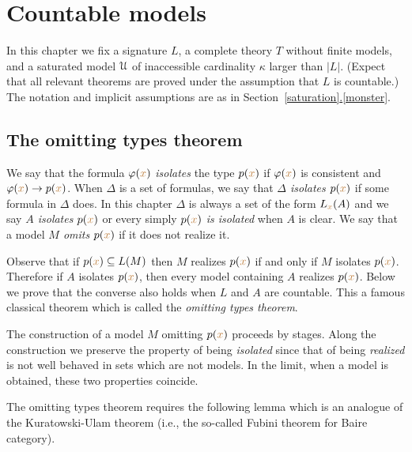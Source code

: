 \documentclass[creche.tex]{subfiles}
\begin{document}
\chapter{Countable models}
\label{countable}

\def\ceq#1#2#3{\parbox[b]{30ex}{$\displaystyle #1$}\parbox[b]{6ex}{\hfil$#2$}$\displaystyle #3$}

In this chapter we fix a signature $L$, a complete theory $T$ without finite models, and a saturated model $\EuScript U$ of inaccessible cardinality $\kappa$ larger than $|L|$.
(Expect that all relevant theorems are proved under the assumption that $L$ is countable.)
The notation and implicit assumptions are as in Section~\hyperref[monster]{\ref*{saturation}.\ref*{monster}}.



\section{The omitting types theorem}\label{omttingtype}

We say that the formula $\varphi({\color{brown} x})$ \emph{isolates\/} the type $p({\color{brown} x})$ if $\varphi({\color{brown} x})$ is consistent and $\varphi({\color{brown} x})\rightarrow p({\color{brown} x})$.
When $\Delta$ is a set of formulas, we say that \emph{$\Delta$ isolates $p({\color{brown} x})$\/} if some formula in $\Delta$ does.
In this chapter $\Delta$ is always a set of the form $L_{{\color{brown} x}}(A)$ and we say  \emph{$A$ isolates $p({\color{brown} x})$\/} or every simply \emph{$p({\color{brown} x})$ is isolated\/} when $A$ is clear.
We say that a model \emph{$M$ omits $p({\color{brown} x})$\/} if it does not realize it.


Observe that if $p({\color{brown} x})\subseteq L(M)$ then $M$ realizes $p({\color{brown} x})$ if and only if $M$ isolates  $p({\color{brown} x})$.
Therefore if $A$ isolates $p({\color{brown} x})$, then every model containing $A$ realizes $p({\color{brown} x})$.
Below we prove that the converse also holds when $L$ and $A$ are countable.
This a famous classical theorem  which is called the \textit{omitting types theorem}.

The construction of a model $M$ omitting $p({\color{brown} x})$ proceeds by stages.
Along the construction we preserve the property of being {\em isolated\/}  since that of being {\em realized\/} is not well behaved in sets which are not models.
In the limit, when a model is obtained, these two properties coincide.

The omitting types theorem requires the following lemma which is an analogue of the Kura\-towski-Ulam theorem (i.e., the so-called Fubini theorem for Baire category).
\end{document}
